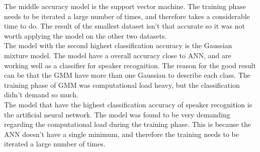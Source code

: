 The middle accuracy model is the support vector machine.
The training phase needs to be iterated a large number of times, and therefore takes a considerable time to do. 
The result of the smallest dataset isn't that accurate so it was not worth applying the model on the other two datasets.\\

The model with the second highest classification accuracy is the Gaussian mixture model.
The model have a overall accuracy close to ANN, and are working well as a classifier for speaker recognition. 
The reason for the good result can be that the GMM have more than one Gaussian to describe each class.
The training phase of GMM was computational load heavy, but the classification didn't demand so much.\\

The model that have the highest classification accuracy of speaker recognition is the artificial neural network.
The model was found to be very demanding regarding the computational load during the training phase. 
This is because the ANN doesn't have a single minimum, and therefore the training needs to be iterated a large number of times. 




